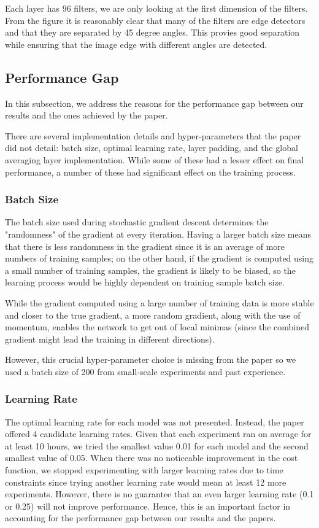     Each layer has 96 filters, we are only looking at the first dimension of the filters. From the figure it is reasonably clear that many of the filters are edge detectors and that they are separated by 45 degree angles. This provies good separation while ensuring that the image edge with different angles are detected.
\subsection{Performance Gap}
In this subsection, we address the reasons for the performance gap between our results and the ones achieved by the paper.

There are several implementation details and hyper-parameters that the paper did not detail: batch size, optimal learning rate, layer padding, and the global averaging layer implementation. While some of these had a lesser effect on final performance, a number of these had significant effect on the training process.

\subsubsection{Batch Size}
The batch size used during stochastic gradient descent determines the "randomness" of the gradient at every iteration. Having a larger batch size means that there is less randomness in the gradient since it is an average of more numbers of training samples; on the other hand, if the gradient is computed using a small number of training samples, the gradient is likely to be biased, so the learning process would be highly dependent on training sample batch size.

While the gradient computed using a large number of training data is more stable and closer to the true gradient, a more random gradient, along with the use of momentum, enables the network to get out of local minimas (since the combined gradient might lead the training in different directions).

However, this crucial hyper-parameter choice is missing from the paper so we used a batch size of 200 from small-scale experiments and past experience.

\subsubsection{Learning Rate}
The optimal learning rate for each model was not presented. Instead, the paper offered 4 candidate learning rates. Given that each experiment ran on average for at least 10 hours, we tried the smallest value 0.01 for each model and the second smallest value of 0.05. When there was no noticeable improvement in the cost function, we stopped experimenting with larger learning rates due to time constraints since trying another learning rate would mean at least 12 more experiments. However, there is no guarantee that an even larger learning rate (0.1 or 0.25) will not improve performance. Hence, this is an important factor in accounting for the performance gap between our results and the papers.

